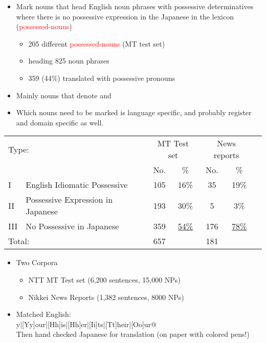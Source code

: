 \documentclass[a4paper,landscape,headrule,footrule,xetex]{foils}
\newcommand{\trg}[1]{\textcolor{red}{#1}}
\begin{document}




\begin{itemize}
\item Mark nouns that head English noun phrases with possessive
  determinatives where there is no possessive expression in the
  Japanese in the lexicon (\trg{possessed-nouns})
   \begin{itemize}
      \item 205 different \trg{possessed-nouns} (MT test set)
      \item heading 825 noun phrases
      \item 359 (44\%) translated with possessive pronouns
    \end{itemize}
\item  Mainly nouns that denote  and   
\item Which nouns need to be marked is language specific, and probably
  register and domain specific as well.
\end{itemize}
  



\noindent\begin{tabular}{llccccc}
  \multicolumn{2}{l}{Type:}  &
  \multicolumn{2}{c}{MT Test set} &
  \multicolumn{2}{c}{News reports} \\
   & & No.  & \%  & No.  & \%  \\ \hline
   I & English Idiomatic Possessive & 105 & 16\% & 35 & 19\% \\
   II & Possessive Expression in Japanese & 193 & 30\% & 5 & 3\% \\
   III &No Possessive in Japanese & 359 &  \underline{54\%}& 176 & \underline{78\%} \\
  \multicolumn{2}{l}{Total:} &  657 & & 181 & 
\end{tabular}

\begin{itemize}
\item Two Corpora
  \begin{itemize}
  \item NTT MT Test set (6,200 sentences, 15,000 NPs)
  \item Nikkei News Reports (1,382 sentences, 8000 NPs)
  \end{itemize}
\item Matched English:
\\  \verb@[Mm]y|[Yy]our|[Hh]is|[Hh]er|[Ii]ts|[Tt]heir|[Oo]ur@
\\ Then hand checked Japanese for translation (on paper with colored pens!)
\end{itemize}
\end{document}

